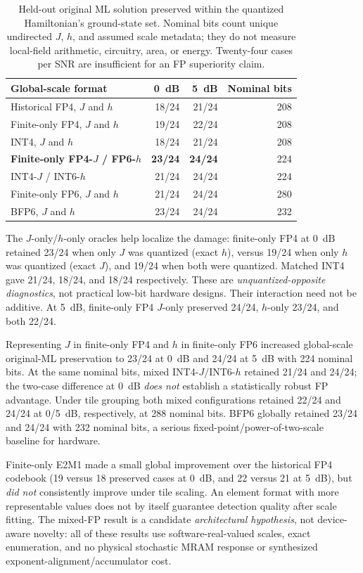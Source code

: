 \documentclass[11pt,a4paper]{article}
\begin{document}
\begin{table}[htbp]
\centering\small
\begin{tabular}{@{}lrrr@{}}\toprule
Global-scale format & 0~dB & 5~dB & Nominal bits\\\midrule
Historical FP4, $J$ and $h$ & 18/24 & 21/24 & 208\\
Finite-only FP4, $J$ and $h$ & 19/24 & 22/24 & 208\\
INT4, $J$ and $h$ & 18/24 & 21/24 & 208\\
\textbf{Finite-only FP4-$J$ / FP6-$h$} & \textbf{23/24} & \textbf{24/24} & 224\\
INT4-$J$ / INT6-$h$ & 21/24 & 24/24 & 224\\
Finite-only FP6, $J$ and $h$ & 21/24 & 24/24 & 280\\
BFP6, $J$ and $h$ & 23/24 & 24/24 & 232\\\bottomrule
\end{tabular}
\caption{Held-out original ML solution preserved within the
quantized Hamiltonian's ground-state set. Nominal bits count
unique undirected $J$, $h$, and assumed scale metadata; they do
not measure local-field arithmetic, circuitry, area, or energy.
Twenty-four cases per SNR are insufficient for an FP
superiority claim.}
\label{tab:m1c-mixed}
\end{table}

The $J$-only/$h$-only oracles help localize the damage:
finite-only FP4 at 0~dB retained 23/24 when only $J$ was
quantized (exact $h$), versus 19/24 when only $h$ was quantized
(exact $J$), and 19/24 when both were quantized. Matched INT4
gave 21/24, 18/24, and 18/24 respectively. These are
\emph{unquantized-opposite diagnostics}, not practical low-bit
hardware designs. Their interaction need not be additive.
At 5~dB, finite-only FP4 $J$-only preserved 24/24,
$h$-only 23/24, and both 22/24.

Representing $J$ in finite-only FP4 and $h$ in finite-only
FP6 increased global-scale original-ML preservation to
23/24 at 0~dB and 24/24 at 5~dB with 224 nominal bits.
At the same nominal bits, mixed INT4-$J$/INT6-$h$ retained
21/24 and 24/24; the two-case difference at 0~dB
\emph{does not} establish a statistically robust FP advantage.
Under tile grouping both mixed configurations retained 22/24
and 24/24 at 0/5~dB, respectively, at 288 nominal bits.
BFP6 globally retained 23/24 and 24/24 with 232 nominal bits,
a serious fixed-point/power-of-two-scale baseline for hardware.

Finite-only E2M1 made a small global improvement over the
historical FP4 codebook (19 versus 18 preserved cases
at 0~dB, and 22 versus 21 at 5~dB), but \emph{did not}
consistently improve under tile scaling. An element format
with more representable values does not by itself
guarantee detection quality after scale fitting.
The mixed-FP result is a candidate \emph{architectural
hypothesis}, not device-aware novelty: all of these results use
software-real-valued scales, exact enumeration, and no
physical stochastic MRAM response or synthesized
exponent-alignment/accumulator cost.
\end{document}
